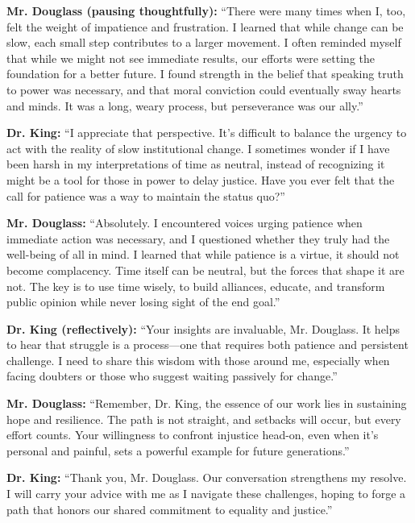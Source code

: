 \documentclass[12pt]{article}
\begin{document}
\bigskip

\textbf{Mr. Douglass (pausing thoughtfully):} “There were many times when I, too, felt the weight of impatience and frustration. I learned that while change can be slow, each small step contributes to a larger movement. I often reminded myself that while we might not see immediate results, our efforts were setting the foundation for a better future. I found strength in the belief that speaking truth to power was necessary, and that moral conviction could eventually sway hearts and minds. It was a long, weary process, but perseverance was our ally.”

\bigskip

\textbf{Dr. King:} “I appreciate that perspective. It’s difficult to balance the urgency to act with the reality of slow institutional change. I sometimes wonder if I have been harsh in my interpretations of time as neutral, instead of recognizing it might be a tool for those in power to delay justice. Have you ever felt that the call for patience was a way to maintain the status quo?”

\textbf{Mr. Douglass:} “Absolutely. I encountered voices urging patience when immediate action was necessary, and I questioned whether they truly had the well-being of all in mind. I learned that while patience is a virtue, it should not become complacency. Time itself can be neutral, but the forces that shape it are not. The key is to use time wisely, to build alliances, educate, and transform public opinion while never losing sight of the end goal.”

\bigskip

\textbf{Dr. King (reflectively):} “Your insights are invaluable, Mr. Douglass. It helps to hear that struggle is a process—one that requires both patience and persistent challenge. I need to share this wisdom with those around me, especially when facing doubters or those who suggest waiting passively for change.”

\bigskip

\textbf{Mr. Douglass:} “Remember, Dr. King, the essence of our work lies in sustaining hope and resilience. The path is not straight, and setbacks will occur, but every effort counts. Your willingness to confront injustice head-on, even when it’s personal and painful, sets a powerful example for future generations.”

\bigskip

\textbf{Dr. King:} “Thank you, Mr. Douglass. Our conversation strengthens my resolve. I will carry your advice with me as I navigate these challenges, hoping to forge a path that honors our shared commitment to equality and justice.”
\end{document}
